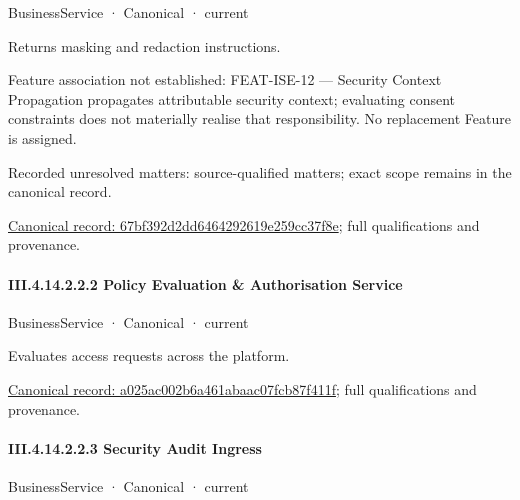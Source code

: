 \label{element:67bf392d2dd6464292619e259cc37f8e}
{\small BusinessService · Canonical · current}\par

Returns masking and redaction instructions.



Feature association not established: FEAT-ISE-12 — Security Context Propagation propagates attributable security context; evaluating consent constraints does not materially realise that responsibility. No replacement Feature is assigned.


{\small Recorded unresolved matters: source-qualified matters; exact scope remains in the canonical record.}\par
{\footnotesize \href{../../../../../../../continuum/business/business-service/67bf392d2dd6464292619e259cc37f8e.md}{Canonical record: 67bf392d2dd6464292619e259cc37f8e}; full qualifications and provenance.}\par
\paragraph*{III.4.14.2.2.2 Policy Evaluation \& Authorisation Service}
\label{navigation:III.4.14.2.2.2}

\label{element:a025ac002b6a461abaac07fcb87f411f}
{\small BusinessService · Canonical · current}\par

Evaluates access requests across the platform.


{\footnotesize \href{../../../../../../../continuum/business/business-service/a025ac002b6a461abaac07fcb87f411f.md}{Canonical record: a025ac002b6a461abaac07fcb87f411f}; full qualifications and provenance.}\par
\paragraph*{III.4.14.2.2.3 Security Audit Ingress}
\label{navigation:III.4.14.2.2.3}

\label{element:43c4a2aa7b4548ec8fdc2844e3d666b6}
{\small BusinessService · Canonical · current}\par

